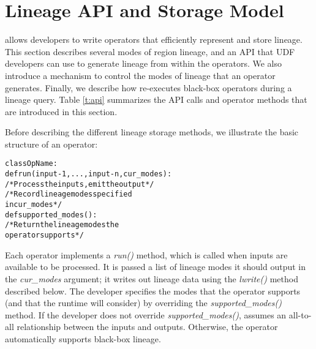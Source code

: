 \section{Lineage API and Storage Model}
\label{s:storagemodel}

\sys{} allows developers to write operators that efficiently represent and
store  lineage.  This section describes several modes of region lineage, and an
API that UDF developers can use to generate lineage from within the operators.  We
also introduce a mechanism to control the modes of lineage that an operator
generates.  Finally, we describe how \sys{} re-executes black-box operators
during a lineage query.  Table \ref{t:api} summarizes the API calls and
operator methods that are introduced in this section.

Before describing the different lineage storage methods, we illustrate the
basic structure of an operator:

{\footnotesize
\begin{alltt}
class OpName:
   def run(input-1,...,input-n,cur_modes):
      /* Process the inputs, emit the output */
      /* Record lineage modes specified
         in cur_modes */
    def supported_modes():
      /* Return the lineage modes the
         operator supports */
\end{alltt}
}

Each operator implements a {\it run()} method, which is called when inputs are
available to be processed.  It is passed a list of lineage modes it should
output in the {\it cur\_modes} argument; it writes out lineage data using
the {\it lwrite()} method described below.  The developer specifies the modes
that the operator supports (and that the runtime will consider) by overriding
the {\it supported\_modes()} method.  If the developer does not override {\it
supported\_modes()}, \sys{} assumes an all-to-all relationship between the
inputs and outputs.  Otherwise, the operator automatically supports black-box
lineage.



